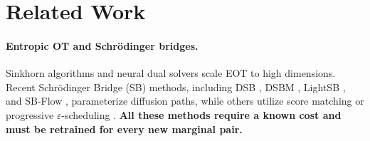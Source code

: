 \documentclass[11pt]{article}
\theoremstyle{definition}
\numberwithin{equation}{section}%
\begin{document}


\section{Related Work}
\label{sec:related}

\paragraph{Entropic OT and Schrödinger bridges.}
Sinkhorn algorithms \citep{cuturi2013sinkhorn} and neural dual solvers \citep{seguy2018largescale,makkuva2020optimal} scale EOT to high dimensions. Recent Schrödinger Bridge (SB) methods, including DSB \citep{debortoli2021diffusion}, DSBM \citep{shi2023diffusion}, LightSB \citep{gazdieva2024light}, and SB-Flow \citep{debortoli2024sbflow}, parameterize diffusion paths, while others utilize score matching \citep{gushchin2023entropic} or progressive $\varepsilon$-scheduling \citep{kassraie2024progot}. \textbf{All these methods require a known cost and must be retrained for every new marginal pair.}
\end{document}
